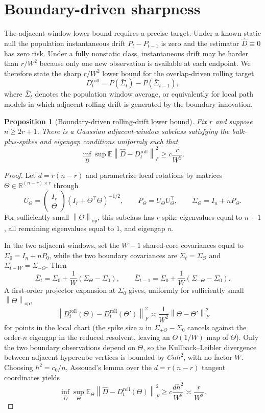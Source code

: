 \documentclass[11pt]{article}
\theoremstyle{tightplain}
\newtheorem{proposition}[theorem]{Proposition}
\theoremstyle{tightdef}
\DeclareMathOperator{\op}{op}
\newcommand{\E}{\mathbb E}
\newcommand{\norm}[1]{\left\lVert #1 \right\rVert}
\begin{document}
\section{Boundary-driven sharpness}

The adjacent-window lower bound requires a precise target. Under a known static
null the population instantaneous drift $P_t-P_{t-1}$ is zero and the estimator
$\widehat D\equiv0$ has zero risk. Under a fully nonstatic class, instantaneous
drift may be harder than $r/W^2$ because only one new observation is available
at each endpoint. We therefore state the sharp $r/W^2$ lower bound for the
overlap-driven rolling target
\[
D_t^{\mathrm{roll}}
=
P(\bar\Sigma_t)-P(\bar\Sigma_{t-1}),
\]
where $\bar\Sigma_t$ denotes the population window average, or equivalently for
local path models in which adjacent rolling drift is generated by the boundary
innovation.

\begin{proposition}[Boundary-driven rolling-drift lower bound]\label{prop:rollinglower}
Fix $r$ and suppose $n\ge2r+1$. There is a Gaussian adjacent-window subclass
satisfying the bulk-plus-spikes and eigengap conditions uniformly such that
\[
\inf_{\widehat D}\sup
\E\norm{\widehat D-D_t^{\mathrm{roll}}}_F^2
\ge
c\frac r{W^2}.
\]
\end{proposition}

\begin{proof}
Let $d=r(n-r)$ and parametrize local rotations by matrices
$\Theta\in\mathbb R^{(n-r)\times r}$ through
\[
U_\Theta=
\begin{pmatrix}
I_r\\
\Theta
\end{pmatrix}
(I_r+\Theta^\top\Theta)^{-1/2},
\qquad
P_\Theta=U_\Theta U_\Theta^\top,
\qquad
\Sigma_\Theta=I_n+nP_\Theta.
\]
For sufficiently small $\norm{\Theta}_{\op}$, this subclass has $r$ spike
eigenvalues equal to $n+1$, all remaining eigenvalues equal to $1$, and
eigengap $n$.

In the two adjacent windows, set the $W-1$ shared-core covariances equal to
$\Sigma_0=I_n+nP_0$, while the two boundary covariances are
$\Sigma_t=\Sigma_\Theta$ and $\Sigma_{t-W}=\Sigma_{-\Theta}$. Then
\[
\bar\Sigma_t=\Sigma_0+\frac1W(\Sigma_\Theta-\Sigma_0),
\qquad
\bar\Sigma_{t-1}=\Sigma_0+\frac1W(\Sigma_{-\Theta}-\Sigma_0).
\]
A first-order projector expansion at $\Sigma_0$ gives, uniformly for
sufficiently small $\norm{\Theta}_{\op}$,
\[
\norm{D_t^{\mathrm{roll}}(\Theta)-D_t^{\mathrm{roll}}(\Theta')}_F^2
\asymp
\frac1{W^2}\norm{\Theta-\Theta'}_F^2
\]
for points in the local chart (the spike size $n$ in
$\Sigma_{\pm\Theta}-\Sigma_0$ cancels against the order-$n$ eigengap in the
reduced resolvent, leaving an $O(1/W)$ map of $\Theta$). Only the two boundary
observations depend on $\Theta$, so the Kullback--Leibler divergence between
adjacent hypercube vertices is bounded by $C n h^2$, with no factor $W$.
Choosing $h^2=c_0/n$, Assouad's lemma \cite{Assouad1983,Yu1997,Tsybakov2009}
over the $d=r(n-r)$ tangent coordinates yields
\[
\inf_{\widehat D}\sup_\Theta
\E_\Theta\norm{\widehat D-D_t^{\mathrm{roll}}(\Theta)}_F^2
\ge
c\frac{d h^2}{W^2}
\asymp
\frac r{W^2}.
\]
\end{proof}
\end{document}
